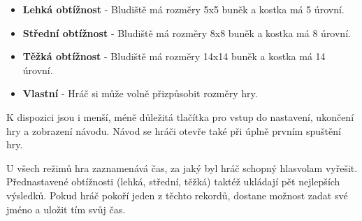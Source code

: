 \begin{itemize}
  \item \textbf{Lehká obtížnost} - Bludiště má rozměry 5x5 buněk a kostka má 5 úrovní.
  \item \textbf{Střední obtížnost} - Bludiště má rozměry 8x8 buněk a kostka má 8 úrovní.
  \item \textbf{Těžká obtížnost} - Bludiště má rozměry 14x14 buněk a kostka má 14 úrovní.
  \item \textbf{Vlastní} - Hráč si může volně přizpůsobit rozměry hry.
\end{itemize}

K dispozici jsou i menší, méně důležitá tlačítka pro vstup do nastavení, ukončení hry a zobrazení návodu. Návod se hráči otevře také při úplně prvním spuštění hry.

U všech režimů hra zaznamenává čas, za jaký byl hráč schopný hlasvolam vyřešit. Přednastavené obtížnosti (lehká, střední, těžká) taktéž ukládají pět nejlepších výsledků. Pokud hráč pokoří jeden z těchto rekordů, dostane možnost zadat své jméno a uložit tím svůj čas. 